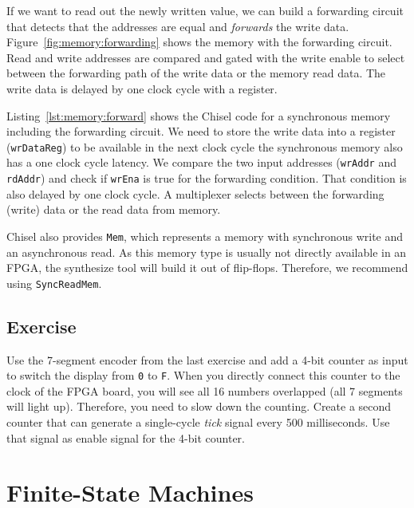 \documentclass[%
    10pt,
    headinclude, footexclude,
    openright, %
    notitlepage,
    cleardoubleempty,
    headsepline,
    pointlessnumbers,
    bibtotoc, idxtotoc,
    ]{scrbook}
\newcommand{\code}[1]{{\small{\texttt{#1}}}}
\newcommand{\todo}[1]{{\emph{TODO: #1}}}
\renewcommand{\todo}[1]{}
\begin{document}
If we want to read out the newly written value, we can build a forwarding
circuit that detects that the addresses are equal and \emph{forwards} the
write data. Figure~\ref{fig:memory:forwarding} shows the memory with
the forwarding circuit. Read and write addresses are compared and gated with
the write enable to select between the forwarding path of the write data or the
memory read data. The write data is delayed by one clock cycle with a register.

Listing~\ref{lst:memory:forward} shows the Chisel code for a synchronous memory
including the forwarding circuit. We need to store the write data into a register
(\code{wrDataReg}) to be available in the next clock cycle the synchronous
memory also has a one clock cycle latency.
We compare the two input addresses (\code{wrAddr} and \code{rdAddr})
and check if \code{wrEna} is true for the forwarding condition.
That condition is also delayed by one clock cycle.
A multiplexer selects between the forwarding (write) data or the read
data from memory.




Chisel also provides \code{Mem}, which represents a memory with synchronous
write and an asynchronous read. As this memory type is usually not directly available
in an FPGA, the synthesize tool will build it out of flip-flops.
Therefore, we recommend using \code{SyncReadMem}.


\section{Exercise}

Use the 7-segment encoder from the last exercise and add a 4-bit counter as input
to switch the display from \code{0} to \code{F}. When you directly connect this
counter to the clock of the FPGA board, you will see all 16 numbers
overlapped (all 7 segments will light up).
Therefore, you need to slow down the counting. Create a second
counter that can generate a single-cycle \emph{tick} signal every 500 milliseconds.
Use that signal as enable signal for the 4-bit counter.

\todo{Luca: More exercises would be nice. Maybe in the future?}

\chapter{Finite-State Machines}
\end{document}
